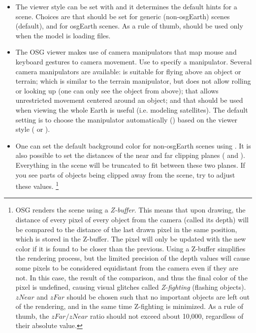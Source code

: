 \begin{itemize}

\item {}
    The viewer style can be set with  and it determines
    the default hints for a scene. Choices are  that should
    be set for generic (non-osgEarth) scenes (default), and 
    for osgEarth scenes. As a rule of thumb,  should be used
    only when the model is loading  files.

\item {}
    The OSG viewer makes use of camera manipulators that map mouse and keyboard
    gestures to camera movement. Use  to
    specify a manipulator. Several camera manipulators are available:
     is suitable for flying above an object or terrain;
     which is similar to the terrain manipulator, but does
    not allow rolling or looking up (one can only see the object from above);
     that allows unrestricted movement centered around an
    object; and  that should be used when viewing the whole
    Earth is useful (i.e. modeling satellites). The default setting is to
    choose the manipulator automatically () based on the viewer
    style ( or ).

\item {} One can set the default background color for
    non-osgEarth scenes using . It is also possible
    to set the distances of the near and far clipping planes
    ( and ). Everything in the scene will
    be truncated to fit between these two planes. If you see parts of objects
    being clipped away from the scene, try to adjust these values.
    \footnote{OSG renders the scene using a \textit{Z-buffer}. This means
    that upon drawing, the distance of every pixel of every object from the
    camera (called its depth) will be compared to the distance of the last
    drawn pixel in the same position, which is stored in the Z-buffer. The
    pixel will only be updated with the new color if it is found to be closer
    than the previous. Using a Z-buffer simplifies the rendering process,
    but the limited precision of the depth values will cause some pixels to
    be considered equidistant from the camera even if they are not. In this
    case, the result of the comparison, and thus the final color of the pixel
    is undefined, causing visual glitches called \textit{Z-fighting}
    (flashing objects). $zNear$ and $zFar$ should be chosen such that no
    important objects are left out of the rendering, and in the same time
    Z-fighting is minimized. As a rule of thumb, the $zFar/zNear$
    ratio should not exceed about 10,000, regardless of their absolute value.}


\end{itemize}
